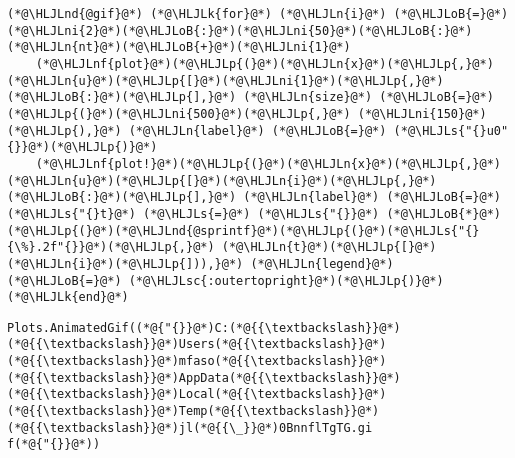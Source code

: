 \documentclass[12pt,landscape]{article}
\newcommand{\HLJLk}[1]{\textcolor[RGB]{148,91,176}{\textbf{#1}}}
\newcommand{\HLJLn}[1]{#1}
\newcommand{\HLJLnd}[1]{\textcolor[RGB]{214,102,97}{#1}}
\newcommand{\HLJLnf}[1]{\textcolor[RGB]{66,102,213}{#1}}
\newcommand{\HLJLs}[1]{\textcolor[RGB]{201,61,57}{#1}}
\newcommand{\HLJLsc}[1]{\textcolor[RGB]{201,61,57}{#1}}
\newcommand{\HLJLni}[1]{\textcolor[RGB]{59,151,46}{#1}}
\newcommand{\HLJLoB}[1]{\textcolor[RGB]{102,102,102}{\textbf{#1}}}
\newcommand{\HLJLp}[1]{#1}
\begin{document}
{\begin{lstlisting}
(*@\HLJLnd{@gif}@*) (*@\HLJLk{for}@*) (*@\HLJLn{i}@*) (*@\HLJLoB{=}@*) (*@\HLJLni{2}@*)(*@\HLJLoB{:}@*)(*@\HLJLni{50}@*)(*@\HLJLoB{:}@*)(*@\HLJLn{nt}@*)(*@\HLJLoB{+}@*)(*@\HLJLni{1}@*) 
    (*@\HLJLnf{plot}@*)(*@\HLJLp{(}@*)(*@\HLJLn{x}@*)(*@\HLJLp{,}@*) (*@\HLJLn{u}@*)(*@\HLJLp{[}@*)(*@\HLJLni{1}@*)(*@\HLJLp{,}@*)(*@\HLJLoB{:}@*)(*@\HLJLp{],}@*) (*@\HLJLn{size}@*) (*@\HLJLoB{=}@*) (*@\HLJLp{(}@*)(*@\HLJLni{500}@*)(*@\HLJLp{,}@*) (*@\HLJLni{150}@*)(*@\HLJLp{),}@*) (*@\HLJLn{label}@*) (*@\HLJLoB{=}@*) (*@\HLJLs{"{}u0"{}}@*)(*@\HLJLp{)}@*)
    (*@\HLJLnf{plot!}@*)(*@\HLJLp{(}@*)(*@\HLJLn{x}@*)(*@\HLJLp{,}@*) (*@\HLJLn{u}@*)(*@\HLJLp{[}@*)(*@\HLJLn{i}@*)(*@\HLJLp{,}@*)(*@\HLJLoB{:}@*)(*@\HLJLp{],}@*) (*@\HLJLn{label}@*) (*@\HLJLoB{=}@*) (*@\HLJLs{"{}t}@*) (*@\HLJLs{=}@*) (*@\HLJLs{"{}}@*) (*@\HLJLoB{*}@*) (*@\HLJLp{(}@*)(*@\HLJLnd{@sprintf}@*)(*@\HLJLp{(}@*)(*@\HLJLs{"{}{\%}.2f"{}}@*)(*@\HLJLp{,}@*) (*@\HLJLn{t}@*)(*@\HLJLp{[}@*)(*@\HLJLn{i}@*)(*@\HLJLp{])),}@*) (*@\HLJLn{legend}@*) (*@\HLJLoB{=}@*) (*@\HLJLsc{:outertopright}@*)(*@\HLJLp{)}@*)
(*@\HLJLk{end}@*)
\end{lstlisting}

\begin{lstlisting}
Plots.AnimatedGif((*@{"{}}@*)C:(*@{{\textbackslash}}@*)(*@{{\textbackslash}}@*)Users(*@{{\textbackslash}}@*)(*@{{\textbackslash}}@*)mfaso(*@{{\textbackslash}}@*)(*@{{\textbackslash}}@*)AppData(*@{{\textbackslash}}@*)(*@{{\textbackslash}}@*)Local(*@{{\textbackslash}}@*)(*@{{\textbackslash}}@*)Temp(*@{{\textbackslash}}@*)(*@{{\textbackslash}}@*)jl(*@{{\_}}@*)0BnnflTgTG.gi
f(*@{"{}}@*))
\end{lstlisting}


}
\end{document}
